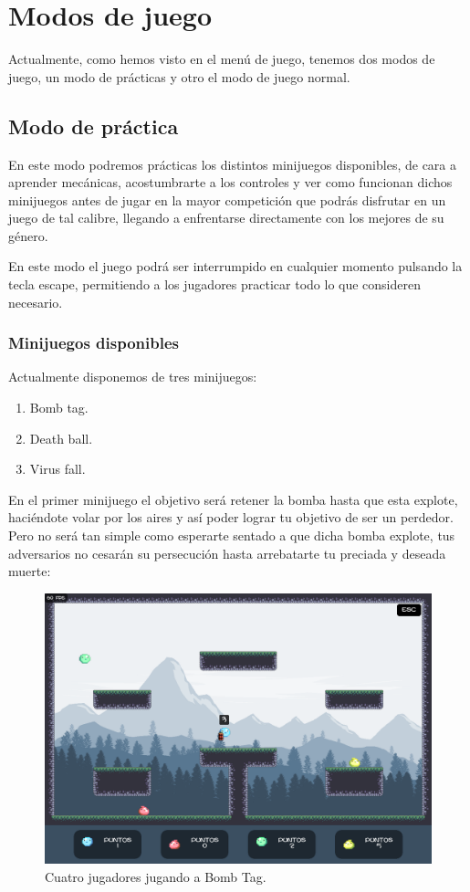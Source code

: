 \documentclass[12pt, spanish]{article}
\begin{document}
\section{Modos de juego}

Actualmente, como hemos visto en el menú de juego, tenemos dos modos de juego, un modo de prácticas y otro el modo de juego normal.

\subsection{Modo de práctica}

En este modo podremos prácticas los distintos minijuegos disponibles, de cara a aprender mecánicas, acostumbrarte a los controles y ver como funcionan dichos minijuegos antes de jugar en la mayor competición que podrás disfrutar en un juego de tal calibre, llegando a enfrentarse directamente con los mejores de su género.

En este modo el juego podrá ser interrumpido en cualquier momento pulsando la tecla escape, permitiendo a los jugadores practicar todo lo que consideren necesario.

\subsubsection{Minijuegos disponibles}

Actualmente disponemos de tres minijuegos:

\begin{enumerate}
	\item Bomb tag.
	\item Death ball.
	\item Virus fall.
\end{enumerate}

En el primer minijuego el objetivo será retener la bomba hasta que esta explote, haciéndote volar por los aires y así poder lograr tu objetivo de ser un perdedor. Pero no será tan simple como esperarte sentado a que dicha bomba explote, tus adversarios no cesarán su persecución hasta arrebatarte tu preciada y deseada muerte:

\begin{figure}[H]
	\centering
	\includegraphics[width=\textwidth]{"modos/juego_bomba.png"}
	\caption{Cuatro jugadores jugando a Bomb Tag.}\label{figure:juego_bomba}
\end{figure}
\end{document}
